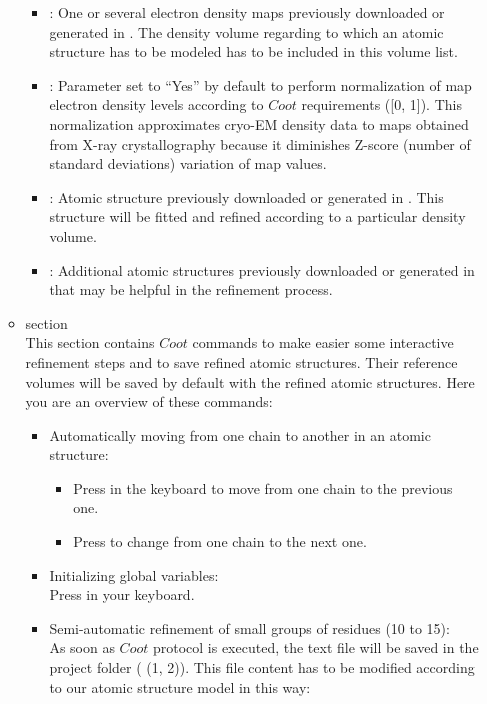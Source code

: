 \begin{itemize}
\begin{itemize}
    \begin{itemize}
     \item {}: One or several electron density maps previously downloaded or generated in \scipion. The density volume regarding to which an atomic structure has to be modeled has to be included in this volume list.\\
     \item {}: Parameter set to ``Yes'' by default to perform normalization of map electron density levels according to $Coot$ requirements ([0, 1]). This normalization approximates cryo-EM density data to maps obtained from X-ray crystallography because it diminishes Z-score (number of standard deviations) variation of map values.\\  
     \item {}: Atomic structure previously downloaded or generated in \scipion. This structure will be fitted and refined according to a particular density volume.\\
     \item {}: Additional atomic structures previously downloaded or generated in \scipion that may be helpful in the refinement process.\\
    \end{itemize}
    \item {} section\\
    
    This section contains $Coot$ commands to make easier some interactive refinement steps and to save refined atomic structures. Their reference volumes will be saved by default with the refined atomic structures. Here you are an overview of these commands:\\
    \begin{itemize}
     \item Automatically moving from one chain to another in an atomic structure:\\
     \begin{itemize}
      \item Press  in the keyboard to move from one chain to the previous one.\\
      \item Press  to change from one chain to the next one.\\
     \end{itemize} 
     \item Initializing global variables:\\
     Press  in your keyboard.\\ 
     \item Semi-automatic refinement of small groups of residues (10 to 15):\\As soon as $Coot$ protocol is executed, the text file  will be saved in the project folder  ( (1, 2)). This file content has to be modified according to our atomic structure model in this way:\\
     \begin{itemize}


\end{itemize}
\end{itemize}
\end{itemize}
\end{itemize}
